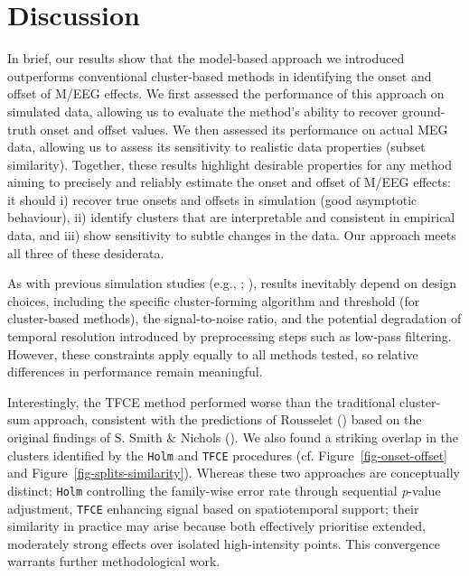 \documentclass[
  doc,
  floatsintext,
  longtable,
  a4paper,
  nolmodern,
  notxfonts,
  notimes,
  colorlinks=true,linkcolor=blue,citecolor=blue,urlcolor=blue]{apa7}
\begin{document}
\section{Discussion}\label{discussion}

In brief, our results show that the model-based approach we introduced
outperforms conventional cluster-based methods in identifying the onset
and offset of M/EEG effects. We first assessed the performance of this
approach on simulated data, allowing us to evaluate the method's ability
to recover ground-truth onset and offset values. We then assessed its
performance on actual MEG data, allowing us to assess its sensitivity to
realistic data properties (subset similarity). Together, these results
highlight desirable properties for any method aiming to precisely and
reliably estimate the onset and offset of M/EEG effects: it should i)
recover true onsets and offsets in simulation (good asymptotic
behaviour), ii) identify clusters that are interpretable and consistent
in empirical data, and iii) show sensitivity to subtle changes in the
data. Our approach meets all three of these desiderata.

As with previous simulation studies (e.g.,
;
), results
inevitably depend on design choices, including the specific
cluster-forming algorithm and threshold (for cluster-based methods), the
signal-to-noise ratio, and the potential degradation of temporal
resolution introduced by preprocessing steps such as low-pass filtering.
However, these constraints apply equally to all methods tested, so
relative differences in performance remain meaningful.

Interestingly, the TFCE method performed worse than the traditional
cluster-sum approach, consistent with the predictions of Rousselet
() based on the original
findings of S. Smith \& Nichols (). We
also found a striking overlap in the clusters identified by the
\texttt{Holm} and \texttt{TFCE} procedures (cf.
Figure~\ref{fig-onset-offset} and Figure~\ref{fig-splits-similarity}).
Whereas these two approaches are conceptually distinct; \texttt{Holm}
controlling the family-wise error rate through sequential \emph{p}-value
adjustment, \texttt{TFCE} enhancing signal based on spatiotemporal
support; their similarity in practice may arise because both effectively
prioritise extended, moderately strong effects over isolated
high-intensity points. This convergence warrants further methodological
work.
\end{document}
